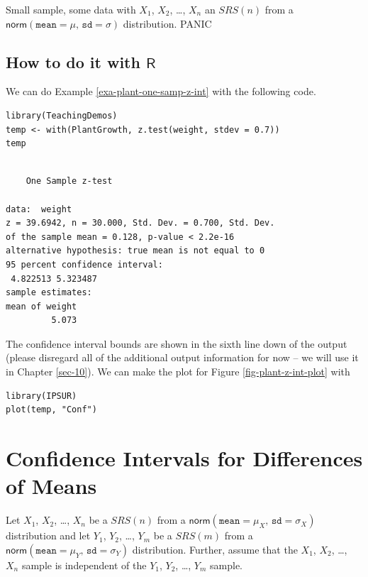 \documentclass[captions=tableheading]{scrbook}
\begin{document}
\begin{example}
Small sample, some data with \(X_{1}\), \(X_{2}\), \ldots{}, \(X_{n}\) an \(SRS(n)\) from a \(\mathsf{norm}(\mathtt{mean}=\mu,\,\mathtt{sd}=\sigma)\) distribution.  PANIC
\end{example}
\subsection{How to do it with \(\mathsf{R}\)}
\label{sec-9-2-1}

We can do Example \ref{exa-plant-one-samp-z-int} with the following code.



\lstset{language=R}
\begin{lstlisting}
library(TeachingDemos)
temp <- with(PlantGrowth, z.test(weight, stdev = 0.7))
temp
\end{lstlisting}


\begin{verbatim}
 
	One Sample z-test

data:  weight 
z = 39.6942, n = 30.000, Std. Dev. = 0.700, Std. Dev.
of the sample mean = 0.128, p-value < 2.2e-16
alternative hypothesis: true mean is not equal to 0 
95 percent confidence interval:
 4.822513 5.323487 
sample estimates:
mean of weight 
         5.073
\end{verbatim}

The confidence interval bounds are shown in the sixth line down of the output (please disregard all of the additional output information for now -- we will use it in Chapter \ref{sec-10}). We can make the plot for Figure \ref{fig-plant-z-int-plot} with


\lstset{language=R}
\begin{lstlisting}
library(IPSUR)
plot(temp, "Conf")
\end{lstlisting}
\section{Confidence Intervals for Differences of Means}
\label{sec-9-3}
\label{sec-Conf-Interv-for-Diff-Means}


Let \(X_{1}\), \(X_{2}\), \ldots{}, \(X_{n}\) be a \(SRS(n)\) from a \(\mathsf{norm}(\mathtt{mean}=\mu_{X},\,\mathtt{sd}=\sigma_{X})\) distribution and let \(Y_{1}\), \(Y_{2}\), \ldots{}, \(Y_{m}\) be a \(SRS(m)\) from a \(\mathsf{norm}(\mathtt{mean}=\mu_{Y},\,\mathtt{sd}=\sigma_{Y})\) distribution. Further, assume that the \(X_{1}\), \(X_{2}\), \ldots{}, \(X_{n}\) sample is independent of the \(Y_{1}\), \(Y_{2}\), \ldots{}, \(Y_{m}\) sample.
\end{document}
